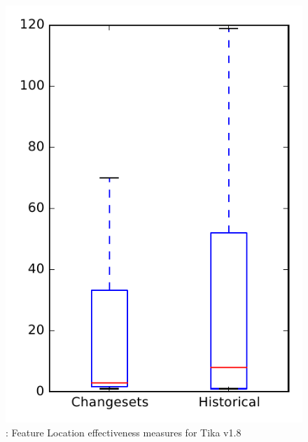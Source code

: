 
\begin{figure}
\centering
\includegraphics[height=0.4\textheight]{figures/flt/rq2_tika_no_outlier}
\caption{\ftwo: Feature Location effectiveness measures for Tika v1.8}
\label{fig:flt:rq2:tika}
\end{figure}
